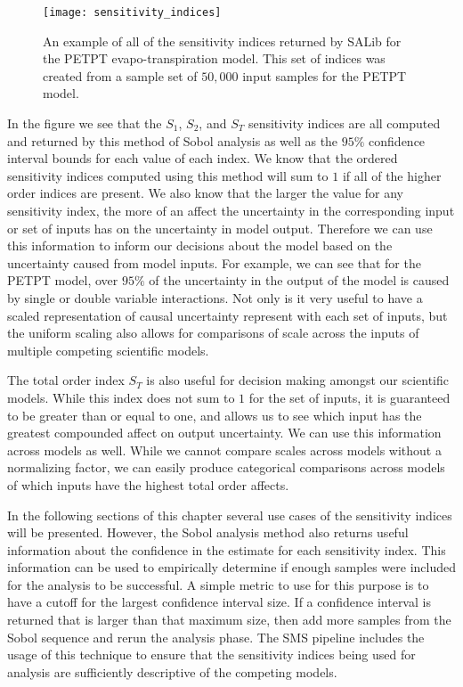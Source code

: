 \FloatBarrier
\begin{figure}[!htbp]
    \label{sens_idxs}
    \centering
    \texttt{[image: sensitivity\_indices]}%
    \caption[PETPT Sensitivity Indices]{An example of all of the sensitivity indices returned by SALib for the PETPT evapo-transpiration model. This set of indices was created from a sample set of $50,000$ input samples for the PETPT model.}
\end{figure}
\FloatBarrier

In the figure we see that the $S_1$, $S_2$, and $S_T$ sensitivity indices are all computed and returned by this method of Sobol analysis as well as the $95\%$ confidence interval bounds for each value of each index.
We know that the ordered sensitivity indices computed using this method will sum to $1$ if all of the higher order indices are present. \cite{sobol2001globalSA}
We also know that the larger the value for any sensitivity index, the more of an affect the uncertainty in the corresponding input or set of inputs has on the uncertainty in model output.
Therefore we can use this information to inform our decisions about the model based on the uncertainty caused from model inputs.
For example, we can see that for the PETPT model, over $95\%$ of the uncertainty in the output of the model is caused by single or double variable interactions.
Not only is it very useful to have a scaled representation of causal uncertainty represent with each set of inputs, but the uniform scaling also allows for comparisons of scale across the inputs of multiple competing scientific models.

The total order index $S_T$ is also useful for decision making amongst our scientific models.
While this index does not sum to $1$ for the set of inputs, it is guaranteed to be greater than or equal to one, and allows us to see which input has the greatest compounded affect on output uncertainty.
We can use this information across models as well.
While we cannot compare scales across models without a normalizing factor, we can easily produce categorical comparisons across models of which inputs have the highest total order affects.

In the following sections of this chapter several use cases of the sensitivity indices will be presented.
However, the Sobol analysis method also returns useful information about the confidence in the estimate for each sensitivity index.
This information can be used to empirically determine if enough samples were included for the analysis to be successful.
A simple metric to use for this purpose is to have a cutoff for the largest confidence interval size.
If a confidence interval is returned that is larger than that maximum size, then add more samples from the Sobol sequence and rerun the analysis phase.
The SMS pipeline includes the usage of this technique to ensure that the sensitivity indices being used for analysis are sufficiently descriptive of the competing models.

